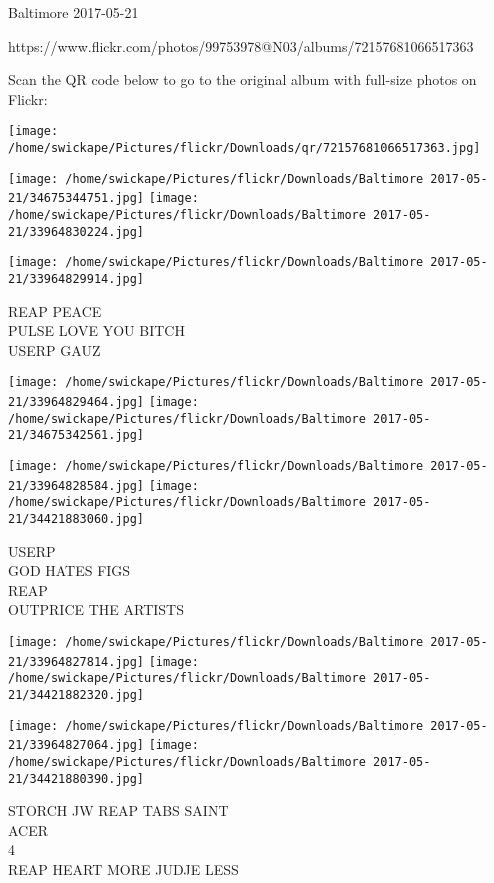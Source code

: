 \documentclass[10pt,letterpaper]{article}
\begin{document}
Baltimore 2017-05-21

https://www.flickr.com/photos/99753978@N03/albums/72157681066517363

Scan the QR code below to go to the original album with full-size photos on Flickr:

\texttt{[image: /home/swickape/Pictures/flickr/Downloads/qr/72157681066517363.jpg]}
\pagebreak

\texttt{[image: /home/swickape/Pictures/flickr/Downloads/Baltimore 2017-05-21/34675344751.jpg]}
\texttt{[image: /home/swickape/Pictures/flickr/Downloads/Baltimore 2017-05-21/33964830224.jpg]}

\vspace{0.25in}
\texttt{[image: /home/swickape/Pictures/flickr/Downloads/Baltimore 2017-05-21/33964829914.jpg]}

REAP PEACE\\
PULSE LOVE YOU BITCH\\
USERP GAUZ
\pagebreak

\texttt{[image: /home/swickape/Pictures/flickr/Downloads/Baltimore 2017-05-21/33964829464.jpg]}
\texttt{[image: /home/swickape/Pictures/flickr/Downloads/Baltimore 2017-05-21/34675342561.jpg]}

\texttt{[image: /home/swickape/Pictures/flickr/Downloads/Baltimore 2017-05-21/33964828584.jpg]}
\texttt{[image: /home/swickape/Pictures/flickr/Downloads/Baltimore 2017-05-21/34421883060.jpg]}

USERP\\
GOD HATES FIGS\\
REAP\\
OUTPRICE THE ARTISTS
\pagebreak

\texttt{[image: /home/swickape/Pictures/flickr/Downloads/Baltimore 2017-05-21/33964827814.jpg]}
\texttt{[image: /home/swickape/Pictures/flickr/Downloads/Baltimore 2017-05-21/34421882320.jpg]}

\texttt{[image: /home/swickape/Pictures/flickr/Downloads/Baltimore 2017-05-21/33964827064.jpg]}
\texttt{[image: /home/swickape/Pictures/flickr/Downloads/Baltimore 2017-05-21/34421880390.jpg]}

STORCH JW REAP TABS SAINT\\
ACER\\
4\\
REAP HEART MORE JUDJE LESS
\pagebreak
\end{document}
